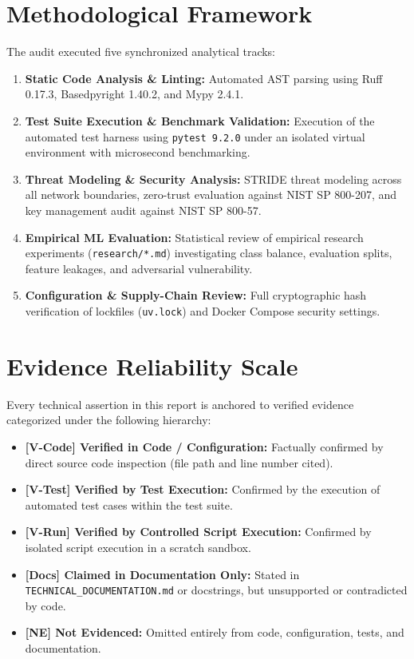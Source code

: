 \documentclass[10pt,a4paper]{report}
\begin{document}
\section{Methodological Framework}
The audit executed five synchronized analytical tracks:
\begin{enumerate}
  \item \textbf{Static Code Analysis \& Linting:} Automated AST parsing using Ruff 0.17.3, Basedpyright 1.40.2, and Mypy 2.4.1.
  \item \textbf{Test Suite Execution \& Benchmark Validation:} Execution of the automated test harness using \texttt{pytest 9.2.0} under an isolated virtual environment with microsecond benchmarking.
  \item \textbf{Threat Modeling \& Security Analysis:} STRIDE threat modeling across all network boundaries, zero-trust evaluation against NIST SP 800-207, and key management audit against NIST SP 800-57.
  \item \textbf{Empirical ML Evaluation:} Statistical review of empirical research experiments (\texttt{research/*.md}) investigating class balance, evaluation splits, feature leakages, and adversarial vulnerability.
  \item \textbf{Configuration \& Supply-Chain Review:} Full cryptographic hash verification of lockfiles (\texttt{uv.lock}) and Docker Compose security settings.
\end{enumerate}

\section{Evidence Reliability Scale}
Every technical assertion in this report is anchored to verified evidence categorized under the following hierarchy:
\begin{itemize}[leftmargin=*]
  \item \textbf{[V-Code] Verified in Code / Configuration:} Factually confirmed by direct source code inspection (file path and line number cited).
  \item \textbf{[V-Test] Verified by Test Execution:} Confirmed by the execution of automated test cases within the test suite.
  \item \textbf{[V-Run] Verified by Controlled Script Execution:} Confirmed by isolated script execution in a scratch sandbox.
  \item \textbf{[Docs] Claimed in Documentation Only:} Stated in \texttt{TECHNICAL\_DOCUMENTATION.md} or docstrings, but unsupported or contradicted by code.
  \item \textbf{[NE] Not Evidenced:} Omitted entirely from code, configuration, tests, and documentation.
\end{itemize}
\end{document}
